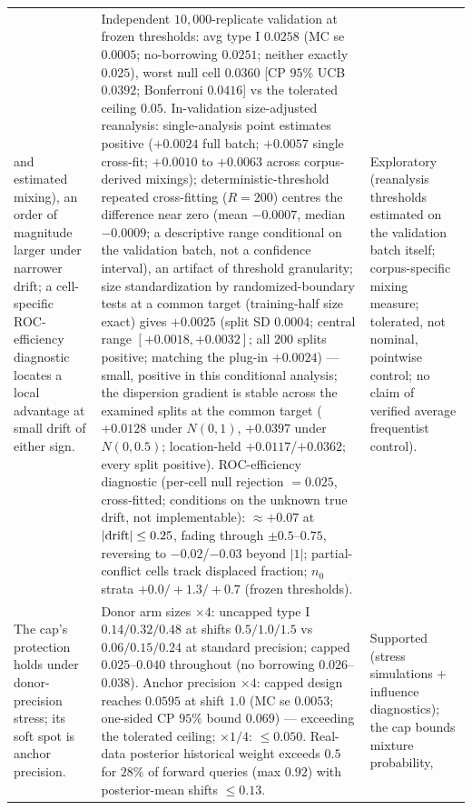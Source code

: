 \documentclass[11pt]{article}
\begin{document}
\begin{longtable}{p{} p{} p{}}
and estimated mixing), an order of magnitude
larger under narrower drift; a cell-specific ROC-efficiency
diagnostic locates a local advantage at small drift of either sign. &
Independent $10{,}000$-replicate validation at frozen thresholds: avg type
I $0.0258$ (MC se $0.0005$; no-borrowing $0.0251$; neither exactly
$0.025$), worst null cell $0.0360$ [CP $95\%$ UCB $0.0392$; Bonferroni
$0.0416$] vs the tolerated ceiling $0.05$. In-validation size-adjusted
reanalysis: single-analysis point estimates positive ($+0.0024$ full
batch; $+0.0057$ single cross-fit; $+0.0010$ to $+0.0063$ across
corpus-derived mixings); deterministic-threshold repeated cross-fitting
($R=200$) centres the
difference near zero (mean $-0.0007$, median $-0.0009$; a descriptive
range conditional on the validation batch, not a confidence interval),
an artifact of threshold granularity; size standardization by
randomized-boundary tests at a common target (training-half size
exact) gives $+0.0025$ (split SD
$0.0004$; central range $[+0.0018,+0.0032]$; all $200$ splits positive;
matching the plug-in $+0.0024$) --- small, positive in this
conditional analysis; the
dispersion
gradient is stable across the examined splits at the common target
($+0.0128$
under $N(0,1)$, $+0.0397$ under $N(0,0.5)$; location-held
$+0.0117$/$+0.0362$; every split positive). ROC-efficiency
diagnostic (per-cell null rejection $=0.025$, cross-fitted; conditions on
the unknown true drift, not implementable): $\approx +0.07$ at
$|{\rm drift}| \le 0.25$, fading through $\pm 0.5$--$0.75$, reversing to
$-0.02$/$-0.03$ beyond $|1|$; partial-conflict cells track displaced
fraction; $n_0$ strata $+0.0/+1.3/+0.7$ (frozen thresholds). &
Exploratory
(reanalysis thresholds estimated on the validation batch itself;
corpus-specific mixing measure; tolerated, not nominal, pointwise
control; no claim of verified average frequentist control). \\
The cap's protection holds under donor-precision stress; its soft spot is
anchor precision. & Donor arm sizes $\times 4$: uncapped type I
$0.14/0.32/0.48$ at shifts $0.5/1.0/1.5$ vs $0.06/0.15/0.24$ at standard
precision; capped $0.025$--$0.040$ throughout (no borrowing
$0.026$--$0.038$). Anchor precision $\times 4$: capped design reaches
$0.0595$ at shift $1.0$ (MC se $0.0053$; one-sided CP $95\%$ bound
$0.069$) --- exceeding the tolerated ceiling; $\times 1/4$: $\le 0.050$.
Real-data posterior
historical weight exceeds $0.5$ for $28\%$ of forward queries (max
$0.92$) with posterior-mean shifts $\le 0.13$. & Supported (stress
simulations + influence diagnostics); the cap bounds mixture probability,

\end{longtable}
\end{document}
